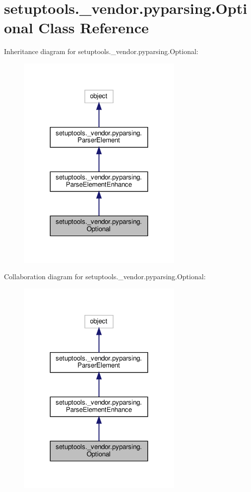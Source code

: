 \hypertarget{classsetuptools_1_1__vendor_1_1pyparsing_1_1Optional}{}\section{setuptools.\+\_\+vendor.\+pyparsing.\+Optional Class Reference}
\label{classsetuptools_1_1__vendor_1_1pyparsing_1_1Optional}


Inheritance diagram for setuptools.\+\_\+vendor.\+pyparsing.\+Optional\+:
\nopagebreak
\begin{figure}[H]
\begin{center}
\leavevmode
\includegraphics[width=227pt]{classsetuptools_1_1__vendor_1_1pyparsing_1_1Optional__inherit__graph}
\end{center}
\end{figure}


Collaboration diagram for setuptools.\+\_\+vendor.\+pyparsing.\+Optional\+:
\nopagebreak
\begin{figure}[H]
\begin{center}
\leavevmode
\includegraphics[width=227pt]{classsetuptools_1_1__vendor_1_1pyparsing_1_1Optional__coll__graph}
\end{center}
\end{figure}
